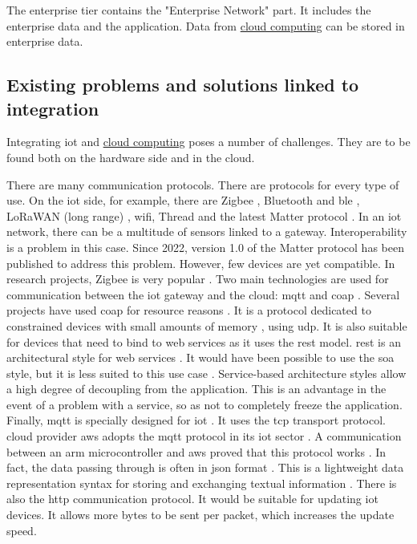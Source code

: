 The enterprise tier contains the "Enterprise Network" part. It includes the enterprise data and the application. Data from \hyperref[subsec:cloudcomputing]{cloud computing} can be stored in enterprise data.

\subsection{Existing problems and solutions linked to integration}
Integrating \acrshort{iot} and \hyperref[subsec:cloudcomputing]{cloud computing} poses a number of challenges. They are to be found both on the hardware side and in the \gls{cloud}. \cite{cloud_of_thing}

There are many communication protocols. There are protocols for every type of use. On the \acrshort{iot} side, for example, there are Zigbee \cite{zigbee}, Bluetooth and \acrfull{ble} \cite{bluetooth}, LoRaWAN (long range) \cite{lora_alliance}, \acrshort{wifi}, Thread \cite{thread} and the latest Matter protocol \cite{matter}. In an \acrshort{iot} network, there can be a multitude of sensors linked to a gateway. Interoperability is a problem in this case. Since 2022, version 1.0 of the Matter protocol has been published to address this problem. However, few devices are yet compatible. In research projects, Zigbee is very popular \cite{state_of_the_art_integration_iot_cloudComputing, cloud_of_thing, secure_integration_iot_cloud_computing, smart_home_integration}. Two main technologies are used for communication between the \acrshort{iot} gateway and the \gls{cloud}: \acrfull{mqtt} \cite{mqtt} and \acrfull{coap} \cite{coap_whitepaper}. Several projects have used \acrshort{coap} for resource reasons \cite{cloudthings, actinium_integration_solution, aws_arm_architecture_iot}. It is a protocol dedicated to constrained devices with small amounts of memory \cite{coap_whitepaper}, using \acrshort{udp}. It is also suitable for devices that need to bind to web services as it uses the \acrfull{rest} model. \acrshort{rest} is an architectural style for web services \cite{cloudthings}. It would have been possible to use the \acrfull{soa} style, but it is less suited to this use case \cite{cloudthings}. Service-based architecture styles allow a high degree of decoupling from the application. This is an advantage in the event of a problem with a service, so as not to completely freeze the application. Finally, \acrshort{mqtt} is specially designed for \acrshort{iot} \cite{mqtt}. It uses the \acrshort{tcp} transport protocol. \Gls{cloud} provider \gls{aws} adopts the \acrshort{mqtt} protocol in its \acrshort{iot} sector \cite{mqtt_aws}. A communication between an \gls{arm} microcontroller and \gls{aws} proved that this protocol works \cite{aws_arm_architecture_iot}. In fact, the data passing through is often in \acrfull{json} format \cite{integration_embedded_systems_cloudComputing, smart_home_integration, itaas_reference_architecture}. This is a lightweight data representation syntax for storing and exchanging textual information \cite{smart_home_integration}. There is also the \acrfull{http} communication protocol. It would be suitable for updating \acrshort{iot} devices. It allows more bytes to be sent per packet, which increases the update speed. 